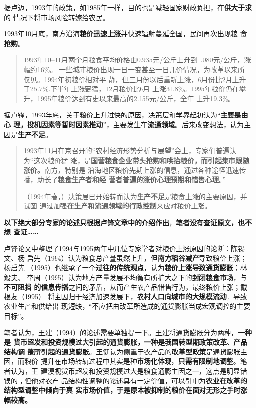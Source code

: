 据卢迈，1993年的政策，如1985年一样，目的也是减轻国家财政负担，在\textbf{供大于求}的
情况下将市场风险转嫁给农民。\cite{lumaisg}

1993年10月底，南方沿海\textbf{粮价迅速上涨}并快速辐射蔓延全国，民间再次出现粮
食\textbf{抢购}。
\begin{quotation}
  1993年10--11月两个月粮食平均价格由0.935元/公斤上升到1.080元/公斤，涨幅约16\%。
  一些城市粮价出现一日一变甚至一日几价情况，为改革以来所仅见。1994年初粮价相对平
  静，但三月份以后重新上涨，6月份比2月上升了25.7\%.下半年上涨更猛，12月粮价比6月
  上涨31.8\%。1995年粮价仍在攀升，1995年粮价达到有史以来最高的2.155元/公斤，全年
  上升19.3\%。\cite{lufengsanci}
\end{quotation}

据卢锋，1993年底，关于粮价上升过快的原因，决策层和学界起初认为“\textbf{主要是由心
  理，投机因素等暂时因素推动}”，主要发生在\textbf{流通领域}。后来改变想法，认为主
因是\textbf{生产不足}。
\begin{quotation}
  1993年11月在京召开的“农村经济形势分析与展望”会上，专家们普遍认为“这次粮价猛
  涨，是\textbf{国营粮食企业带头抢购和哄抬粮价，而引起集市跟随涨价。}南方，特别是
  沿海地区粮价先期上涨的信息，通过各种途径迅速传播，助长了\textbf{粮食生产者和经
    营者普遍的涨价心理预期和惜售心理}。”

  （1994年春，）决策层已开始转而认为\textbf{生产不足}是粮食上涨的主要原因，并试图
  通过加强\textbf{在生产和流通领域的行政控制}来应对粮价上涨。
\end{quotation}

\textbf{以下绝大部分专家的论述只根据卢锋文章中的介绍作出，笔者没有查证原文，也不想
  查证……}

卢锋论文中整理了1994与1995两年中几位专家学者对粮价上涨原因的论断：陈锡文、杨
启先（1994）认为粮食总产量虽然上升，但\textbf{南方稻谷减产}导致粮价上涨；杨启先
（1995）也继承了一个\textbf{过往的传统观点}，认为\textbf{粮价上涨导致通货膨胀}；林毅夫、
李周（1995）认为地方产量发展不均衡有所扩大之下的\textbf{封闭粮食市场}，与\textbf{不可阻挡
  的信息传播}之间的矛盾，从而产生农产品惜售行为，最终粮价上涨；戴根友（1995）
将主因归于经济加速发展下，\textbf{农村人口向城市的大规模流动}，导致农业生产和供给出
现短缺，“不应把由改革所造成的通货膨胀当成宏观调控的主要目标”。

笔者认为，王建（1994）的论述需要单独提一下。王建将通货膨胀分为两种，\textbf{一种是
  货币超发和投资规模过大引起的通货膨胀，一种是我国转型期政策改革、产品结构调
  整所引起的通货膨胀}。王健认为侧重于农产品的\textbf{改革型政策}是通货膨胀主因，而粮价
提升在市场转轨过程中其实是种\textbf{市场化体现}，\textbf{只需有限制地调整}。笔者认为，王
建漠视货币超发和投资规模过大是粮食通膨主因之一，这点是明显错误的；但他对农产
品结构性调整的论述具有一定价值，可以引申为\textbf{农业在改革的结构型调整中倾向于真
  实市场价值，于是原本被抑制的粮价在面对无形之手时涨幅较高。}

